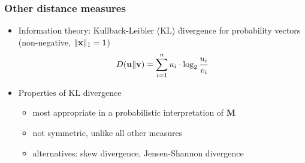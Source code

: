 \begin{frame}
  \frametitle{Other distance measures}
  
  \begin{itemize}
  \item Information theory: \h{Kullback-Leibler} (KL) \h{divergence} for probability vectors (non-negative, $\norm[1]{\vx} = 1$)
    \[
    \KL{\vu}{\vv} = \sum_{i=1}^n u_i \cdot \log_2 \frac{u_i}{v_i}
    \]
    \pause
  \item Properties of KL divergence
    \begin{itemize}
    \item most appropriate in a probabilistic interpretation of $\mathbf{M}$
    \item not symmetric, unlike all other measures
    \item alternatives: skew divergence, Jensen-Shannon divergence
    \end{itemize}
  \end{itemize}
\end{frame}


